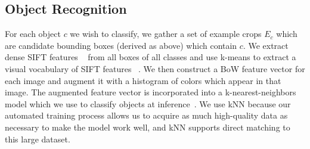 \documentclass[conference]{IEEEtran}
\newcommand{\stnote}[1]{\textcolor{blue}{\textbf{ST: #1}}}
\begin{document}
\subsection{Object Recognition}
\label{sec:recognition}

For each object $c$ we wish to classify, we gather a set of example
crops $E_c$ which are candidate bounding boxes (derived as above)
which contain $c$. We extract dense SIFT features ~\citep{lowe99} from
all boxes of all classes and use k-means to extract a visual
vocabulary of SIFT features ~\citep{szeliski10}. We then construct a
BoW feature vector for each image and augment it with a histogram of
colors which appear in that image.  The augmented feature vector is
incorporated into a k-nearest-neighbors model which we use to classify
objects at inference~\citep{szeliski10}. We use kNN because our
automated training process allows us to acquire as much high-quality
data as necessary to make the model work well, and kNN supports direct
matching to this large dataset.




\end{document}
